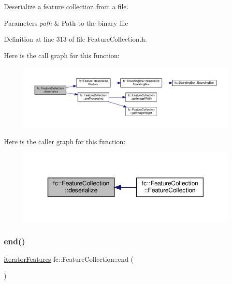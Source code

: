 Deserialize a feature collection from a file. 


\begin{DoxyParams}{Parameters}
{\em path} & Path to the binary file \\
\hline
\end{DoxyParams}


Definition at line 313 of file Feature\+Collection.\+h.

Here is the call graph for this function\+:
\nopagebreak
\begin{figure}[H]
\begin{center}
\leavevmode
\includegraphics[width=350pt]{d9/d78/classfc_1_1FeatureCollection_aad397b4427b4c8805e3330cda59330ef_cgraph}
\end{center}
\end{figure}
Here is the caller graph for this function\+:
\nopagebreak
\begin{figure}[H]
\begin{center}
\leavevmode
\includegraphics[width=330pt]{d9/d78/classfc_1_1FeatureCollection_aad397b4427b4c8805e3330cda59330ef_icgraph}
\end{center}
\end{figure}
\mbox{\label{classfc_1_1FeatureCollection_ac531c63b2dae4e4541b26a3926594dd0}} 
\subsubsection{\texorpdfstring{end()}{end()}}
{\footnotesize\ttfamily \hyperlink{classfc_1_1FeatureCollection_a947efbbe893a14c47d2d5e535a0e9429}{iterator\+Features} fc\+::\+Feature\+Collection\+::end (\begin{DoxyParamCaption}{ }\end{DoxyParamCaption})\hspace{0.3cm}{\ttfamily [inline]}}



